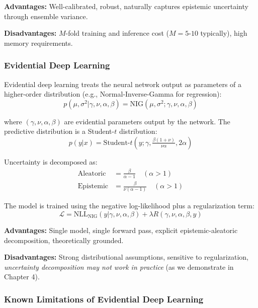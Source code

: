 \textbf{Advantages:} Well-calibrated, robust, naturally captures epistemic uncertainty through ensemble variance.

\textbf{Disadvantages:} $M$-fold training and inference cost ($M = 5$-$10$ typically), high memory requirements.

\subsubsection{Evidential Deep Learning}

Evidential deep learning \cite{sensoy2018evidential,amini2020deep} treats the neural network output as parameters of a higher-order distribution (e.g., Normal-Inverse-Gamma for regression):
\begin{equation}
    p(\mu, \sigma^2 | \gamma, \nu, \alpha, \beta) = \text{NIG}(\mu, \sigma^2; \gamma, \nu, \alpha, \beta)
\end{equation}

where $(\gamma, \nu, \alpha, \beta)$ are evidential parameters output by the network. The predictive distribution is a Student-$t$ distribution:
\begin{equation}
    p(y | x) = \text{Student-}t(y; \gamma, \tfrac{\beta(1+\nu)}{\nu \alpha}, 2\alpha)
\end{equation}

Uncertainty is decomposed as:
\begin{align}
    \text{Aleatoric} &= \frac{\beta}{\alpha - 1} \quad (\alpha > 1) \\
    \text{Epistemic} &= \frac{\beta}{\nu(\alpha - 1)} \quad (\alpha > 1)
\end{align}

The model is trained using the negative log-likelihood plus a regularization term:
\begin{equation}
    \mathcal{L} = \text{NLL}_{\text{NIG}}(y | \gamma, \nu, \alpha, \beta) + \lambda R(\gamma, \nu, \alpha, \beta, y)
\end{equation}

\textbf{Advantages:} Single model, single forward pass, explicit epistemic-aleatoric decomposition, theoretically grounded.

\textbf{Disadvantages:} Strong distributional assumptions, sensitive to regularization, \emph{uncertainty decomposition may not work in practice} (as we demonstrate in Chapter 4).

\subsubsection{Known Limitations of Evidential Deep Learning}

